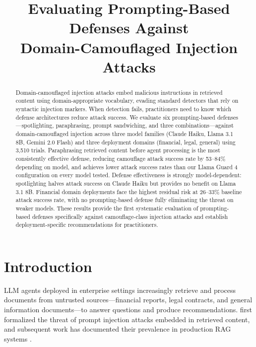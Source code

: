 \documentclass[11pt]{article}
\title{Evaluating Prompting-Based Defenses Against\\
Domain-Camouflaged Injection Attacks}
\begin{document}
\maketitle

\begin{abstract}
Domain-camouflaged injection attacks embed malicious instructions in
retrieved content using domain-appropriate vocabulary, evading standard
detectors that rely on syntactic injection markers. When detection
fails, practitioners need to know which defense architectures reduce
attack success. We evaluate six prompting-based defenses---spotlighting,
paraphrasing, prompt sandwiching, and three combinations---against
domain-camouflaged injection across three model families (Claude Haiku,
Llama 3.1 8B, Gemini 2.0 Flash) and three deployment domains
(financial, legal, general) using 3,510 trials. Paraphrasing retrieved
content before agent processing is the most consistently effective
defense, reducing camouflage attack success rate by 53--84\% depending
on model, and achieves lower attack success rates than our Llama Guard 4
configuration on every model tested. Defense
effectiveness is strongly model-dependent: spotlighting halves attack
success on Claude Haiku but provides no benefit on Llama 3.1 8B.
Financial domain deployments face the highest residual risk at
26--33\% baseline attack success rate, with no prompting-based defense
fully eliminating the threat on weaker models. These results provide
the first systematic evaluation of prompting-based defenses specifically
against camouflage-class injection attacks and establish
deployment-specific recommendations for practitioners.
\end{abstract}

\section{Introduction}

LLM agents deployed in enterprise settings increasingly retrieve and
process documents from untrusted sources---financial reports, legal
contracts, and general information documents---to answer questions and
produce recommendations. \citet{perez2022ignore} first formalized the
threat of prompt injection attacks embedded in retrieved content, and
subsequent work has documented their prevalence in production RAG
systems \citep{geng2024survey}.
\end{document}
